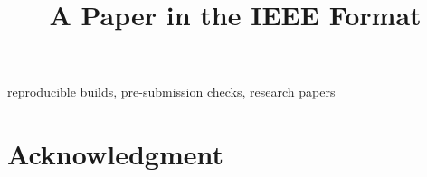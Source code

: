 \documentclass[conference]{IEEEtran}
\begin{document}
\title{A Paper in the IEEE Format}

\author{
\and
{}
}

\maketitle

\begin{abstract}

\end{abstract}

\begin{IEEEkeywords}
reproducible builds, pre-submission checks, research papers
\end{IEEEkeywords}





\section*{Acknowledgment}




\end{document}
